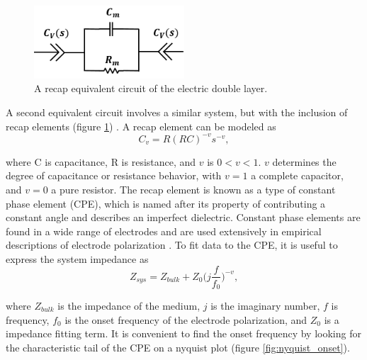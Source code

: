\begin{figure}[h]
    \centering
    \includegraphics[width=0.5\textwidth]{images/edl_recap_equiv.png}
    \caption{A recap equivalent circuit of the electric double layer.}
    \label{fig:edl_recap_equiv}
\end{figure}


\par A second equivalent circuit involves a similar system, but with the inclusion of recap elements (figure \ref{fig:edl_recap_equiv}) \cite{feldman_fractal-polarization_1998-1}. A recap element can be modeled as 
\begin{equation}
    C_v = R(RC)^{-v}s^{-v},
\end{equation}

\noindent where C is capacitance, R is resistance, and $v$ is $0<v<1$. $v$ determines the degree of capacitance or resistance behavior, with $v=1$ a complete capacitor, and $v=0$ a pure resistor. The recap element is known as a type of constant phase element (CPE), which is named after its property of contributing a constant angle and describes an imperfect dielectric. Constant phase elements are found in a wide range of electrodes and are used extensively in empirical descriptions of electrode polarization \cite{ishai_electrode_2013}. To fit data to the CPE, it is useful to express the system impedance as
\begin{equation}
    Z_{sys} = Z_{bulk} + Z_0\bigg(j\frac{f}{f_0}\bigg)^{-v},
\end{equation}

\noindent where $Z_{bulk}$ is the impedance of the medium, $j$ is the imaginary number, $f$ is frequency, $f_0$ is the onset frequency of the electrode polarization, and $Z_0$ is a impedance fitting term. It is convenient to find the onset frequency by looking for the characteristic tail of the CPE on a nyquist plot (figure \ref{fig:nyquist_onset}).

